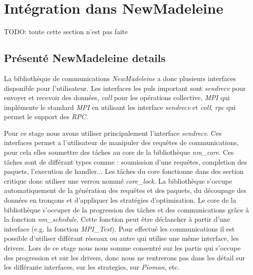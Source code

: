 \section{Intégration dans NewMadeleine}

TODO: toute cette section n'est pas faite


\subsection{Présenté NewMadeleine details}

La bibliothèque de communications \emph{NewMadeleine} a donc plusieurs interfaces disponible pour l'utilisateur.
Les interfaces les puls important sont \emph{sendrecv} pour envoyer et recevoir des données,
\emph{coll} pour les opérations collective,
\emph{MPI} qui implémente le standard \emph{MPI} en utilisant les interface \emph{sendrecv} et \emph{coll},
\emph{rpc} qui permet le support des \emph{RPC}.

Pour ce stage nous avons utiliser principalement l'interface \emph{sendrecv}.
Ces interfaces permet a l'utilisateur de manipuler des requêtes de communications,
pour cela elles soumettre des tâches au core de la bibliothèque \emph{nm_core}.
Ces tâches sont de différant types comme : soumission d'une requêtes, completion des paquets, l'execution de handler...
Les tâches du core fonctionne dans des section critique donc utiliser une verrou nommé \emph{core_lock}.
La bibliothèque s'occupe automatiquement de la génération des requêtes et des paquets,
du découpage des données en tronçons et d'appliquer les stratégies d'optimisation.
Le core de la bibliothèque s'occuper de la progression des tâches et des communications grâce à la fonction \emph{nm_schedule}.
Cette fonction peut être déclancher à partir d'une interface (e.g. la fonction \emph{MPI_Test}).
Pour effectué les communications il est possible d'utiliser différant réseaux ou autre qui utilise une même interface, les drivers. %
Lors de ce stage nous nous somme consentré sur les partis qui s'occupe des progression et sur les drivers,
donc nous ne rentrerons pas dans les détail sur les différante interfaces, sur les strategies, sur \emph{Pioman}, etc.

